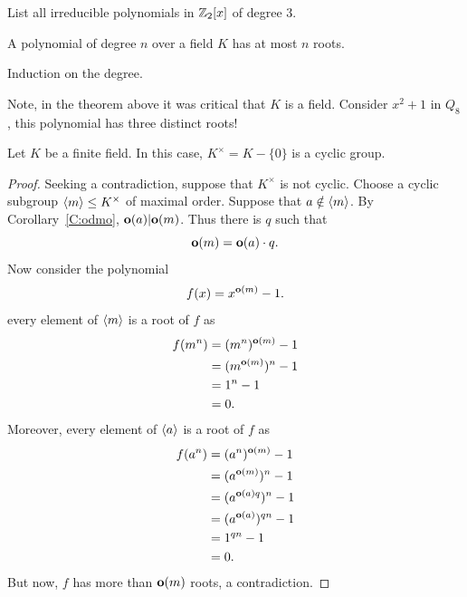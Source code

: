 \documentclass{ximera}
\begin{document}
\begin{exercise}
  List all irreducible polynomials in $\mathbb Z_2[x]$ of degree $3$.
\end{exercise}




\begin{theorem}
  A polynomial of degree $n$ over a field $K$ has at most $n$ roots.
  \begin{sketch}
    Induction on the degree.
  \end{sketch}
\end{theorem}

\begin{remark}
  Note, in the theorem above it was critical that $K$ is a
  field. Consider $x^2+1$ in $Q_8$, this polynomial has three
  distinct roots!
\end{remark}



\begin{theorem}\label{T:mgc}
  Let $K$ be a finite field. In this case, $K^\times = K-\{0\}$ is a
  cyclic group.
  \begin{proof}
    Seeking a contradiction, suppose that $K^\times$ is not
    cyclic. Choose a cyclic subgroup $\langle m\rangle \leq K^\times$ of
    maximal order. Suppose that $a\notin\langle m\rangle$. By
    Corollary~\ref{C:odmo}, $\mathbf o(a)|\mathbf o(m)$. Thus there is $q$ such that
    \[
    \mathbf o(m) = \mathbf o(a)\cdot q.
    \]
    Now consider the polynomial
    \[
    f(x) = x^{\mathbf o(m)}-1.
    \]
    every element of $\langle m\rangle$ is a root of $f$ as
    \begin{align*}
    f(m^n) &=  (m^n)^{\mathbf o(m)} - 1\\
    &= (m^{\mathbf o(m)})^n-1\\
    &= 1^n-1\\
    &=0.
    \end{align*}
    Moreover, every element of $\langle a\rangle$ is a root of $f$ as
    \begin{align*}
    f(a^n) &=  (a^n)^{\mathbf o(m)} - 1\\
    &= (a^{\mathbf o(m)})^n-1\\
    &= (a^{\mathbf o(a)q})^n-1\\
    &= (a^{\mathbf o(a)})^{qn}-1\\
    &= 1^{qn}-1\\
    &=0.
    \end{align*}
    But now, $f$ has more than $\mathbf o(m)$ roots, a contradiction.
  \end{proof}
\end{theorem}
\end{document}
